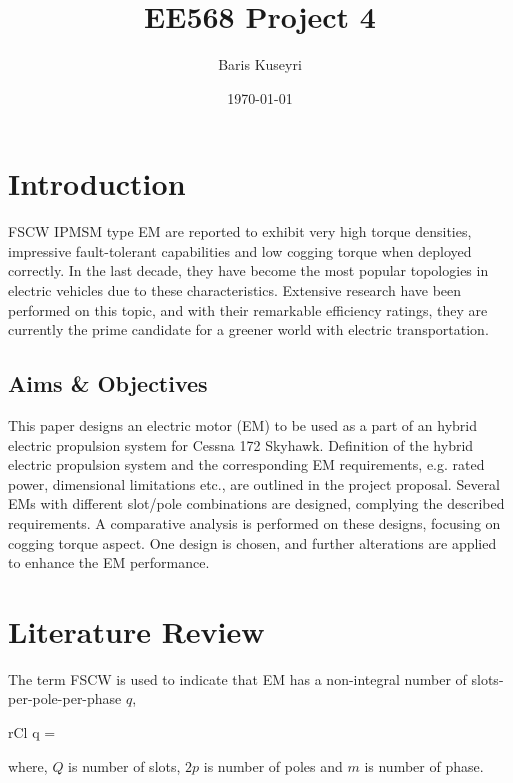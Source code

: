 \documentclass [a4 paper, 11pt, titlepage] {article}
\begin{document}
	\title{EE568 Project 4}
	\author{Baris Kuseyri}
	\date{\today}
	\maketitle
	
	\tableofcontents
	\newpage
	
	\section{Introduction}

	FSCW IPMSM type EM are reported to exhibit very high torque densities, impressive fault-tolerant capabilities and low cogging torque when deployed correctly. In the last decade, they have become the most popular topologies in electric vehicles due to these characteristics. Extensive research have been performed on this topic, and with their remarkable efficiency ratings, they are currently the prime candidate for a greener world with electric transportation.

	\subsection{Aims \& Objectives}
	This paper designs an electric motor (EM) to be used as a part of an hybrid electric propulsion system for Cessna 172 Skyhawk. Definition of the hybrid electric propulsion system and the corresponding EM requirements, e.g. rated power, dimensional limitations etc., are outlined in the project proposal. Several EMs with different slot/pole combinations are designed, complying the described requirements. A comparative analysis is performed on these designs, focusing on cogging torque aspect. One design is chosen, and further alterations are applied to enhance the EM performance.


	\section{Literature Review}
	The term FSCW is used to indicate that EM has a non-integral number of slots-per-pole-per-phase $q$,
	\begin{IEEEeqnarray*}{rCl}
		q = 
	\end{IEEEeqnarray*}
	where, $Q$ is number of slots, $2p$ is number of poles and $m$ is number of phase.
	
\end{document}
